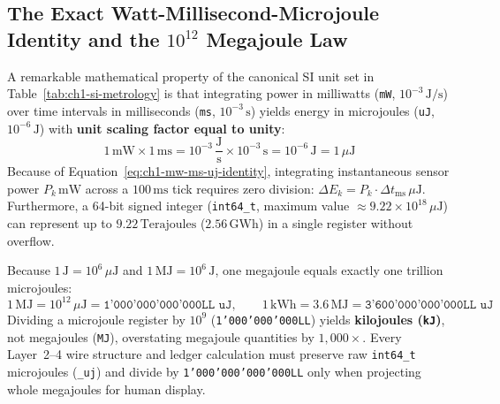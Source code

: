 \subsection{The Exact Watt-Millisecond-Microjoule Identity and the $10^{12}$ Megajoule Law}

A remarkable mathematical property of the canonical SI unit set in Table~\ref{tab:ch1-si-metrology} is that integrating power in milliwatts (\texttt{mW}, $10^{-3}\,\mathrm{J/s}$) over time intervals in milliseconds (\texttt{ms}, $10^{-3}\,\mathrm{s}$) yields energy in microjoules (\texttt{uJ}, $10^{-6}\,\mathrm{J}$) with \textbf{unit scaling factor equal to unity}:
\begin{equation}
1\,\mathrm{mW} \times 1\,\mathrm{ms} = 10^{-3}\,\frac{\mathrm{J}}{\mathrm{s}} \times 10^{-3}\,\mathrm{s} = 10^{-6}\,\mathrm{J} = 1\,\mu\mathrm{J}
\label{eq:ch1-mw-ms-uj-identity}
\end{equation}
Because of Equation~\eqref{eq:ch1-mw-ms-uj-identity}, integrating instantaneous sensor power $P_k\,\mathrm{mW}$ across a $100\,\mathrm{ms}$ tick requires zero division: $\Delta E_k = P_k \cdot \Delta t_{\mathrm{ms}}\,\mu\mathrm{J}$. Furthermore, a 64-bit signed integer (\texttt{int64\_t}, maximum value $\approx 9.22 \times 10^{18}\,\mu\mathrm{J}$) can represent up to $9.22\,\mathrm{Terajoules}$ ($2.56\,\mathrm{GWh}$) in a single register without overflow.

\begin{invariant}
\label{inv:ch1-mj-scaling}
Because $1\,\mathrm{J} = 10^6\,\mu\mathrm{J}$ and $1\,\mathrm{MJ} = 10^6\,\mathrm{J}$, one megajoule equals exactly one trillion microjoules:
\begin{equation}
1\,\mathrm{MJ} = 10^{12}\,\mu\mathrm{J} = \texttt{1'000'000'000'000LL uJ}, \qquad 1\,\mathrm{kWh} = 3.6\,\mathrm{MJ} = \texttt{3'600'000'000'000LL uJ}
\label{eq:ch1-mj-law}
\end{equation}
Dividing a microjoule register by $10^9$ (\texttt{1'000'000'000LL}) yields \textbf{kilojoules (\texttt{kJ})}, not megajoules (\texttt{MJ}), overstating megajoule quantities by $1{,}000\times$. Every Layer~2--4 wire structure and ledger calculation must preserve raw \texttt{int64\_t} microjoules (\texttt{\_uj}) and divide by \texttt{1'000'000'000'000LL} only when projecting whole megajoules for human display.
\end{invariant}

